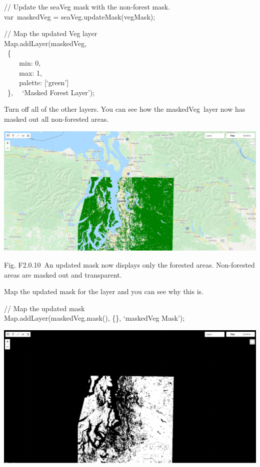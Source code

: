 \documentclass[
  letterpaper,
  DIV=11,
  numbers=noendperiod]{scrreprt}
\begin{document}
// Update the seaVeg mask with the non-forest mask.\\
var~maskedVeg = seaVeg.updateMask(vegMask);

// Map the updated Veg layer\\
Map.addLayer(maskedVeg,\\
\hspace*{0.333em} ~\{\\
\hspace*{0.333em} ~ ~ ~min: 0,\\
\hspace*{0.333em} ~ ~ ~max: 1,\\
\hspace*{0.333em} ~ ~ ~palette: {[}`green'{]}\\
\hspace*{0.333em} ~\},~ ~`Masked Forest Layer');

Turn off all of the other layers. You can see how the maskedVeg~layer
now has masked out all non-forested areas.

\includegraphics{./F2/image26.png}

Fig. F2.0.10~An updated mask now displays only the forested areas.
Non-forested areas are masked out and transparent.

Map the updated mask for the layer and you can see why this is.

// Map the updated mask\\
Map.addLayer(maskedVeg.mask(), \{\}, `maskedVeg Mask');

\includegraphics{./F2/image33.png}
\end{document}
